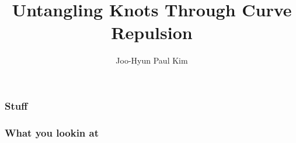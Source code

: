 \documentclass{beamer}
\title{Untangling Knots Through Curve Repulsion}
\author{Joo-Hyun Paul Kim}
\begin{document}
\begin{frame}
    \maketitle
\end{frame}

\begin{frame}
    \frametitle{Stuff}

\end{frame}
\begin{frame}
    \frametitle{What you lookin at}

\end{frame}
\end{document}
